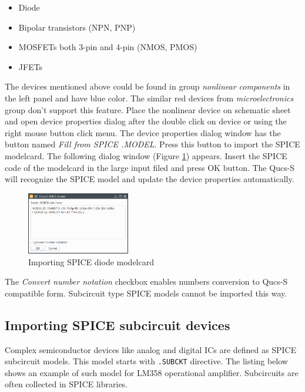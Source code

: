 \documentclass[a4paper,12pt]{article}
\begin{document}
\begin{itemize}
 \item Diode
 \item Bipolar transistors (NPN, PNP)
 \item MOSFETs both 3-pin and 4-pin (NMOS, PMOS)
 \item JFETs
\end{itemize}

The devices mentioned above could be found in group \emph{nonlinear components} in the left panel and have blue color. The similar red devices from \emph{microelectronics} group don't support this feature. Place the nonlinear device on schematic sheet and open device properties dialog after the double click on device or using the right mouse button click menu. The device properties dialog window has the button named \emph{Fill from SPICE .MODEL}. Press this button to import the SPICE modelcard. The following dialog window (Figure \ref{fig:spice_import}) appears. Insert the SPICE code of the modelcard in the large input filed and press OK button. The Qucs-S will recognize the SPICE model and update the device properties automatically.



    \begin{figure}[!ht]
    \begin{center}
        \includegraphics[width=0.4\textwidth]{img/import_modelcard.png}
    \end{center}
    \caption{Importing SPICE diode modelcard} \label{fig:spice_import}
    \end{figure}

The \emph{Convert number notation} checkbox enables numbers conversion to Qucs-S compatible form. Subcircuit type SPICE models cannot be imported this way. 

\subsection{Importing SPICE subcircuit devices}

Complex semiconductor devices like analog and digital ICs are defined as SPICE subcircuit models. This model starts with \verb|.SUBCKT| directive. The listing below shows an example of such model for LM358 operational amplifier. Subcircuits are often collected in SPICE libraries. 
\end{document}
